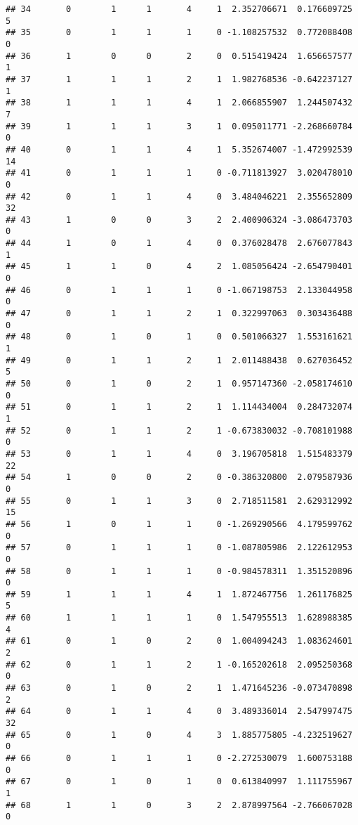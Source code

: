 \documentclass[]{article}
\begin{document}
\begin{verbatim}
## 34       0        1      1       4     1  2.352706671  0.176609725     5
## 35       0        1      1       1     0 -1.108257532  0.772088408     0
## 36       1        0      0       2     0  0.515419424  1.656657577     1
## 37       1        1      1       2     1  1.982768536 -0.642237127     1
## 38       1        1      1       4     1  2.066855907  1.244507432     7
## 39       1        1      1       3     1  0.095011771 -2.268660784     0
## 40       0        1      1       4     1  5.352674007 -1.472992539    14
## 41       0        1      1       1     0 -0.711813927  3.020478010     0
## 42       0        1      1       4     0  3.484046221  2.355652809    32
## 43       1        0      0       3     2  2.400906324 -3.086473703     0
## 44       1        0      1       4     0  0.376028478  2.676077843     1
## 45       1        1      0       4     2  1.085056424 -2.654790401     0
## 46       0        1      1       1     0 -1.067198753  2.133044958     0
## 47       0        1      1       2     1  0.322997063  0.303436488     0
## 48       0        1      0       1     0  0.501066327  1.553161621     1
## 49       0        1      1       2     1  2.011488438  0.627036452     5
## 50       0        1      0       2     1  0.957147360 -2.058174610     0
## 51       0        1      1       2     1  1.114434004  0.284732074     1
## 52       0        1      1       2     1 -0.673830032 -0.708101988     0
## 53       0        1      1       4     0  3.196705818  1.515483379    22
## 54       1        0      0       2     0 -0.386320800  2.079587936     0
## 55       0        1      1       3     0  2.718511581  2.629312992    15
## 56       1        0      1       1     0 -1.269290566  4.179599762     0
## 57       0        1      1       1     0 -1.087805986  2.122612953     0
## 58       0        1      1       1     0 -0.984578311  1.351520896     0
## 59       1        1      1       4     1  1.872467756  1.261176825     5
## 60       1        1      1       1     0  1.547955513  1.628988385     4
## 61       0        1      0       2     0  1.004094243  1.083624601     2
## 62       0        1      1       2     1 -0.165202618  2.095250368     0
## 63       0        1      0       2     1  1.471645236 -0.073470898     2
## 64       0        1      1       4     0  3.489336014  2.547997475    32
## 65       0        1      0       4     3  1.885775805 -4.232519627     0
## 66       0        1      1       1     0 -2.272530079  1.600753188     0
## 67       0        1      0       1     0  0.613840997  1.111755967     1
## 68       1        1      0       3     2  2.878997564 -2.766067028     0

\end{verbatim}
\end{document}
